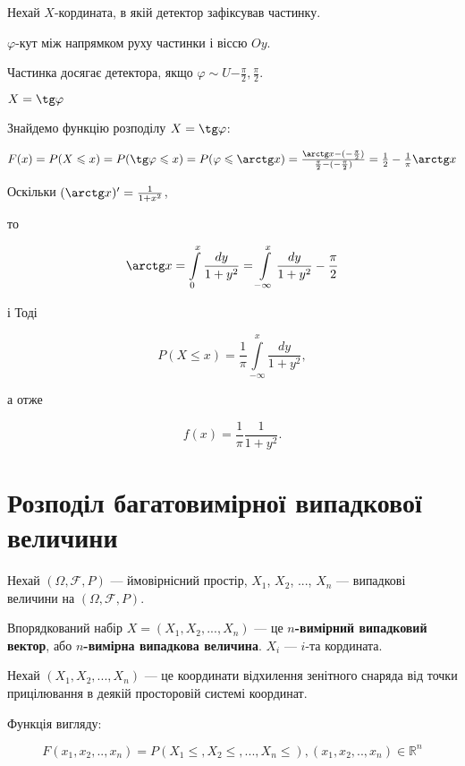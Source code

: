 Нехай $X$-кордината, в якій детектор зафіксував частинку.

\beautifulImage

$\varphi$-кут між напрямком руху частинки і віссю $Oy$.

Частинка досягає детектора, якщо $\varphi \sim U{-\frac{\pi}{2}, \frac{\pi}{2}}$.

$X = \tg \varphi$

Знайдемо функцію розподілу $X = \tg \varphi$:

$F(x)
= P(X \leqslant x)
= P(\tg \varphi \leqslant x)
= P(\varphi \leqslant \arctg x)
= \frac{\arctg x - (-\frac{\pi}{2})}{\frac{\pi}{2} - (-\frac{\pi}{2})}
= \frac{1}{2} - \frac{1}{\pi} \arctg x$

Оскільки $(\arctg x)' = \frac{1}{1+x^2}$,

то

$$\arctg x
= \int\limits_0^x \frac{dy}{1+y^2}
= \int\limits_{-\infty}^x \frac{dy}{1+y^2} - \frac{\pi}{2}$$

і Тоді

$$P(X \leqslant x)
= \frac{1}{\pi} \int\limits_{-\infty}^x \frac{dy}{1+y^2},$$

а отже

$$f(x) = \frac{1}{\pi} \frac{1}{1 + y^2}.$$

\section{Розподіл багатовимірної випадкової величини}

Нехай $(\Omega, \mathcal{F}, P)$ --- ймовірнісний простір, $X_1$, $X_2$, ...,
$X_n$ --- випадкові величини на $(\Omega, \mathcal{F}, P)$.

Впорядкований набір $X = (X_1, X_2, ..., X_n)$ --- це
\textbf{$n$-вимірний випадковий вектор}, або \textbf{$n$-вимірна випадкова
величина}. $X_i$ --- $i$-та кордината.

\begin{example}    
    Нехай $(X_1, X_2, ..., X_n)$ --- це координати відхилення зенітного
    снаряда від точки прицілювання в деякій просторовій системі координат.
\end{example}

Функція вигляду:

\begin{equation}
    F(x_1, x_2, .., x_n)
    = P(X_1 \leqslant, X_2 \leqslant, ..., X_n \leqslant),
    (x_1, x_2, .., x_n) \in \mathbb{R}^n
\end{equation}

